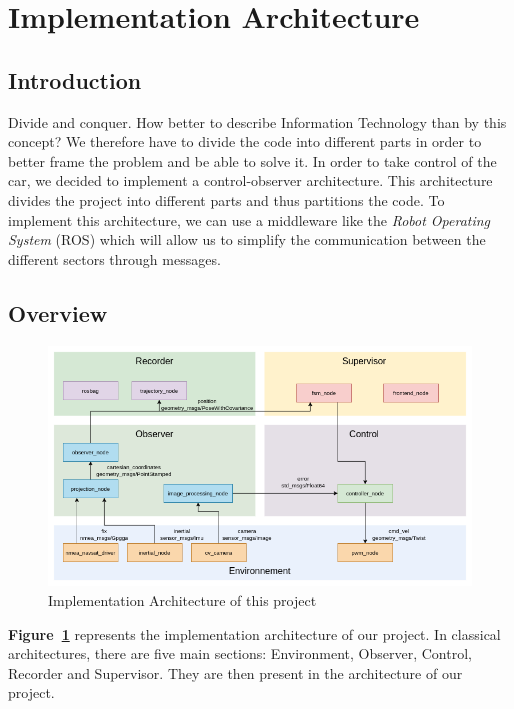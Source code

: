 \section{Implementation Architecture}

\subsection{Introduction}
Divide and conquer. How better to describe Information Technology than by this concept?
We therefore have to divide the code into different parts in order to better frame 
the problem and be able to solve it. In order to take control of the car, we decided 
to implement a control-observer architecture. This architecture divides the project 
into different parts and thus partitions the code. To implement this architecture, we
can use a middleware like the \textit{Robot Operating System} (ROS) which will allow us
to simplify the communication between the different sectors through messages.

\subsection{Overview} %

\begin{figure}[!ht]
    \begin{center}
        \includegraphics[scale=0.51]{Images/node_graph.png}
    \end{center}
    \caption{Implementation Architecture of this project}
    \label{fig:node_graph}
\end{figure}

\textbf{Figure~\ref{fig:node_graph}} represents the implementation architecture of our project.
In classical architectures, there are five main sections: Environment, 
Observer, Control, Recorder and Supervisor. They are then present in the architecture 
of our project. 

